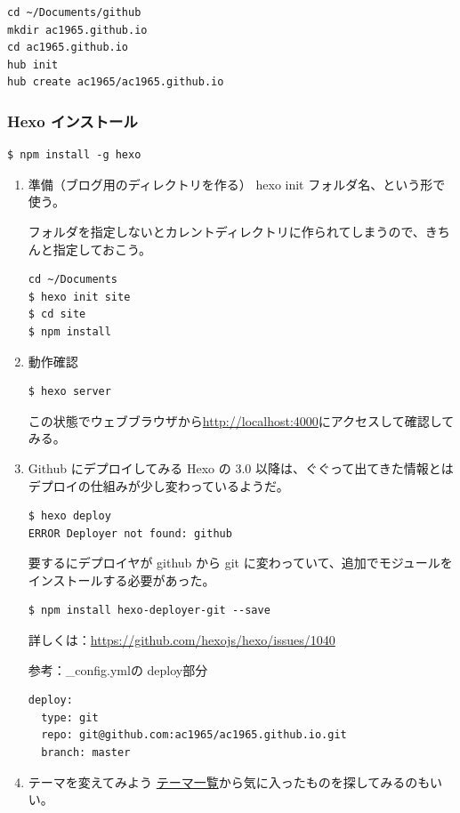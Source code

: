 \documentclass[11pt]{article}
\begin{document}
\begin{verbatim}
cd ~/Documents/github
mkdir ac1965.github.io
cd ac1965.github.io
hub init
hub create ac1965/ac1965.github.io
\end{verbatim}
\subsubsection{Hexo インストール}
\label{sec:org99bf0bd}
\begin{verbatim}
$ npm install -g hexo
\end{verbatim}
\begin{enumerate}
\item 準備（ブログ用のディレクトリを作る）
\label{sec:org1a6122d}
hexo init フォルダ名、という形で使う。

フォルダを指定しないとカレントディレクトリに作られてしまうので、きちんと指定しておこう。

\begin{verbatim}
cd ~/Documents
$ hexo init site
$ cd site
$ npm install
\end{verbatim}
\item 動作確認
\label{sec:org136ecf7}
\begin{verbatim}
$ hexo server
\end{verbatim}

この状態でウェブブラウザから\href{http://localhost:4000/}{http://localhost:4000}にアクセスして確認してみる。
\item Github にデプロイしてみる
\label{sec:org344afe2}
Hexo の 3.0 以降は、ぐぐって出てきた情報とはデプロイの仕組みが少し変わっているようだ。

\begin{verbatim}
$ hexo deploy
ERROR Deployer not found: github
\end{verbatim}

要するにデプロイヤが github から git に変わっていて、追加でモジュールをインストールする必要があった。

\begin{verbatim}
$ npm install hexo-deployer-git --save
\end{verbatim}

詳しくは：\url{https://github.com/hexojs/hexo/issues/1040}

参考：\_config.ymlの deploy部分

\begin{verbatim}
deploy:
  type: git
  repo: git@github.com:ac1965/ac1965.github.io.git
  branch: master
\end{verbatim}
\item テーマを変えてみよう
\label{sec:org5b2c603}
\href{http://hexo.io/themes/}{テーマ一覧}から気に入ったものを探してみるのもいい。


\end{enumerate}
\end{document}
